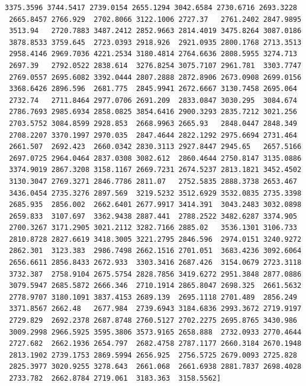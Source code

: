 \documentclass[11pt]{article}
\begin{document}
\begin{Verbatim}[commandchars=\\\{\}]
 3375.3596 3744.5417 2739.0154 2655.1294 3042.6584 2730.6716 2693.3228
 2665.8457 2766.929  2702.8066 3122.1006 2727.37   2761.2402 2847.9895
 3513.94   2720.7883 3487.2412 2852.9663 2814.4019 3475.8264 3087.0186
 3878.8533 3759.645  2723.0393 2918.926  2921.0935 2800.1768 2713.3513
 2958.4146 2969.7036 4221.2534 3180.4814 2764.6636 2808.5955 3274.713
 2697.39   2792.0522 2838.614  3276.8254 3075.7107 2961.781  3303.7747
 2769.0557 2695.6082 3392.0444 2807.2888 2872.8906 2673.0908 2699.0156
 3368.6426 2896.596  2681.775  2845.9941 2672.6667 3130.7458 2695.064
 2732.74   2711.8464 2977.0706 2691.209  2833.0847 3030.295  3084.674
 2786.7693 2985.6934 2858.0825 3854.6416 2900.3293 2835.7212 3021.256
 2703.5752 3084.8599 2928.853  2668.9963 2665.93   2848.0447 2848.349
 2708.2207 3370.1997 2970.035  2847.4644 2822.1292 2975.6694 2731.464
 2661.507  2692.423  2660.0342 2830.3113 2927.8447 2945.65   2657.5166
 2697.0725 2964.0464 2837.0308 3082.612  2860.4644 2750.8147 3135.0886
 3374.9019 2867.3208 3158.1167 2669.7231 2674.5237 2813.1821 3452.4502
 3130.3047 2769.3271 2846.7786 2811.07   2752.5835 2888.3738 2653.467
 3436.0454 2735.3276 2897.569  3219.5232 3512.6929 3532.0835 2735.3398
 2685.935  2856.002  2662.6401 2677.9917 3414.391  3043.2483 3032.0898
 2659.833  3107.697  3362.9438 2887.441  2788.2522 3482.6287 3374.905
 2700.3267 3171.2905 3021.2112 3282.7166 2885.02   3536.1301 3106.733
 2810.8728 2827.6619 3418.3005 3221.2795 2846.596  2974.0151 3240.9272
 2862.301  3123.383  2986.7498 2662.1516 2701.051  3683.4236 3092.6064
 2656.6611 2856.8433 2672.933  3303.3416 2687.426  3154.0679 2723.3118
 3732.387  2758.9104 2675.5754 2828.7856 3419.6272 2951.3848 2877.0886
 3079.5947 2685.5872 2666.346  2710.1914 2865.8047 2698.325  2661.5632
 2778.9707 3180.1091 3837.4153 2689.139  2695.1118 2701.489  2856.249
 3371.8567 2662.48   2677.984  2739.6943 3184.6836 2993.3672 2719.9197
 2729.829  2692.2378 2687.8748 2760.5127 2702.2275 2695.8765 3430.986
 3009.2998 2966.5925 3595.3806 3573.9165 2658.888  2732.0933 2770.4644
 2727.682  2662.1936 2654.797  2682.4758 2787.1177 2660.3184 2670.1948
 2813.1902 2739.1753 2869.5994 2656.925  2756.5725 2679.0093 2725.828
 2825.3977 3020.9255 3278.643  2661.068  2661.6938 2881.7837 2698.4028
 2733.782  2662.8784 2719.061  3183.363  3158.5562]


\end{Verbatim}
\end{document}
